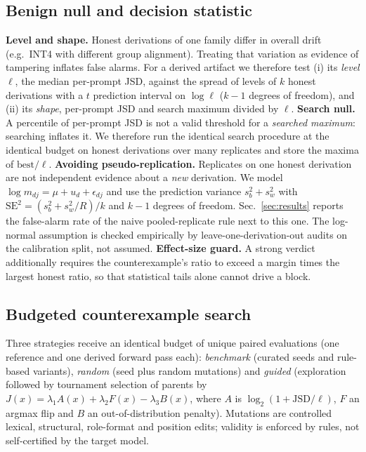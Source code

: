 \IfFileExists{IEEEtran.cls}{\documentclass[conference]{IEEEtran}\newcommand{\hasieee}{1}}{\documentclass[10pt,twocolumn]{article}\newcommand{\hasieee}{0}}
\newcommand{\JSD}{\mathrm{JSD}}
\begin{document}
\subsection{Benign null and decision statistic}\label{sec:null}
\textbf{Level and shape.} Honest derivations of one family differ in overall drift (e.g.\ INT4 with different group alignment). Treating that variation as evidence of tampering inflates false alarms. For a derived artifact we therefore test (i) its \emph{level} $\ell$, the median per-prompt JSD, against the spread of levels of $k$ honest derivations with a $t$ prediction interval on $\log\ell$ ($k-1$ degrees of freedom), and (ii) its \emph{shape}, per-prompt JSD and search maximum divided by $\ell$.
\textbf{Search null.} A percentile of per-prompt JSD is not a valid threshold for a \emph{searched maximum}: searching inflates it. We therefore run the identical search procedure at the identical budget on honest derivations over many replicates and store the maxima of $\mathrm{best}/\ell$.
\textbf{Avoiding pseudo-replication.} Replicates on one honest derivation are not independent evidence about a \emph{new} derivation. We model $\log m_{dj}=\mu+u_d+\epsilon_{dj}$ and use the prediction variance $s_b^2+s_w^2$ with $\mathrm{SE}^2=(s_b^2+s_w^2/R)/k$ and $k-1$ degrees of freedom. Sec.~\ref{sec:results} reports the false-alarm rate of the naive pooled-replicate rule next to this one. The log-normal assumption is checked empirically by leave-one-derivation-out audits on the calibration split, not assumed.
\textbf{Effect-size guard.} A strong verdict additionally requires the counterexample's ratio to exceed a margin times the largest honest ratio, so that statistical tails alone cannot drive a block.

\subsection{Budgeted counterexample search}
Three strategies receive an identical budget of unique paired evaluations (one reference and one derived forward pass each): \emph{benchmark} (curated seeds and rule-based variants), \emph{random} (seed plus random mutations) and \emph{guided} (exploration followed by tournament selection of parents by $J(x)=\lambda_1 A(x)+\lambda_2 F(x)-\lambda_3 B(x)$, where $A$ is $\log_2(1+\JSD/\ell)$, $F$ an argmax flip and $B$ an out-of-distribution penalty). Mutations are controlled lexical, structural, role-format and position edits; validity is enforced by rules, not self-certified by the target model.
\end{document}

